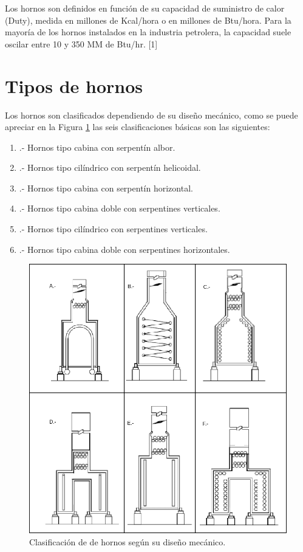 \par Los hornos son definidos en función de su capacidad de suministro de calor (Duty), medida en millones de Kcal/hora o en millones de Btu/hora. Para la mayoría de los hornos instalados en la industria petrolera, la capacidad suele oscilar entre 10 y 350 MM de Btu/hr. [1]

\section{Tipos de hornos}

\par Los hornos son clasificados dependiendo de su diseño mecánico, como se puede apreciar en la Figura \ref{fig:hornos_tipos} las seis clasificaciones b\'asicas son las siguientes:

\begin{enumerate}[label=\Alph*]
    \item .-  Hornos tipo cabina con serpentín albor.
    \item .-  Hornos tipo cilíndrico con serpentín helicoidal.
    \item .-  Hornos tipo cabina con serpentín horizontal.
    \item .-  Hornos tipo cabina doble con serpentines verticales.
    \item .-  Hornos tipo cilíndrico con serpentines verticales.
    \item .-  Hornos tipo cabina doble con serpentines horizontales.
\end{enumerate}

\begin{figure}[hbt]
\begin{center}
\includegraphics[scale=0.45]{images/hornos_tipos}
\caption[Tipos de hornos por diseño mecánico]{Clasificación de de hornos según su diseño mecánico.}
\label{fig:hornos_tipos}
\end{center}
\end{figure}

